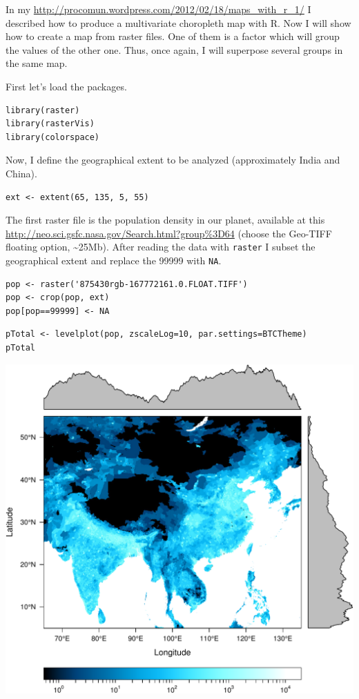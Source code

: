 


In my \url{http://procomun.wordpress.com/2012/02/18/maps_with_r_1/} I described how to produce a multivariate
choropleth map with R.  Now I will show how to create a map from
raster files. One of them is a factor which will group the values of
the other one. Thus, once again, I will superpose several groups in
the same map.

First let's load the packages.


\lstset{language=R}
\begin{lstlisting}
library(raster)
library(rasterVis)
library(colorspace)
\end{lstlisting}

Now, I define the geographical extent to be analyzed (approximately India and China).

\lstset{language=R}
\begin{lstlisting}
ext <- extent(65, 135, 5, 55)
\end{lstlisting}

The first raster file is the population density in our planet,
available at this \url{http://neo.sci.gsfc.nasa.gov/Search.html?group%3D64} (choose the Geo-TIFF floating
option, \~{}25Mb).  After reading the data with \texttt{raster} I subset the
geographical extent and replace the 99999 with \texttt{NA}.



\lstset{language=R}
\begin{lstlisting}
pop <- raster('875430rgb-167772161.0.FLOAT.TIFF')
pop <- crop(pop, ext)
pop[pop==99999] <- NA
\end{lstlisting}


\lstset{language=R}
\begin{lstlisting}
pTotal <- levelplot(pop, zscaleLog=10, par.settings=BTCTheme)
pTotal
\end{lstlisting}

\includegraphics[width=.9\linewidth]{figs/populationNASA.pdf}


